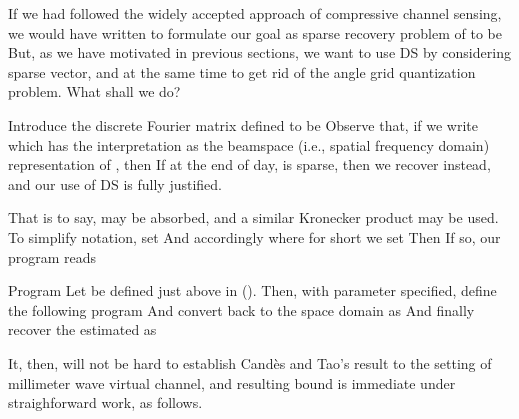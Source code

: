 If we had followed the widely accepted approach of compressive channel sensing, we would have written
%
%
to formulate our goal as sparse recovery problem of  to be
%
%
But, as we have motivated in previous sections, we want to use DS by considering sparse vector, and at the same time to get rid of the angle grid quantization problem.
What shall we do?

\stopsection

\startsection [title={Proposed Method}]

Introduce the discrete Fourier matrix  defined to be
%
%
Observe that, if we write
%
%
which has the interpretation as the beamspace (i.e., spatial frequency domain) representation of , then
%
%
If at the end of day,  is sparse, then we recover  instead, and our use of DS is fully justified.

That is to say,  may be absorbed, and a similar Kronecker product may be used.
To simplify notation, set
%
%
And accordingly
where for short we set
%
Then
%
%
If so, our program reads

\Result
{Program}
{
Let  be defined just above in ().
Then, with parameter \m {\gamma} specified, define the following program
%
%
And convert  back to the space domain as
%
%
And finally recover the estimated  as
%
%
}

It, then, will not be hard to establish Cand\`es and Tao's result to the setting of millimeter wave virtual channel, and resulting bound is immediate under straighforward work, as follows.

\stopsection

\stopchapter
